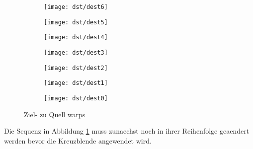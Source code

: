 \begin{figure}[htbp]
	\centering
	    \begin{adjustbox}{margin=-20mm 0mm 0mm 0.2mm}
	    	
	\begin{subfigure}[b]{0.19\textwidth}
		\centering
		\texttt{[image: dst/dest6]} %
		\caption{}
	\end{subfigure}
		\begin{subfigure}[b]{0.19\textwidth}
		\centering
		\texttt{[image: dst/dest5]} %
		\caption{}
	\end{subfigure}
		\begin{subfigure}[b]{0.19\textwidth}
		\centering
		\texttt{[image: dst/dest4]} %
		\caption{}
	\end{subfigure}
		\begin{subfigure}[b]{0.19\textwidth}
		\centering
		\texttt{[image: dst/dest3]} %
		\caption{}
	\end{subfigure}
		\begin{subfigure}[b]{0.19\textwidth}
		\centering
		\texttt{[image: dst/dest2]} %
		\caption{}
	\end{subfigure}
		\begin{subfigure}[b]{0.19\textwidth}
		\centering
		\texttt{[image: dst/dest1]} %
		\caption{}
	\end{subfigure}
		\begin{subfigure}[b]{0.19\textwidth}
		\centering
		\texttt{[image: dst/dest0]} %
		\caption{}
	\end{subfigure}
	
		    \end{adjustbox}
		    
	\caption{Ziel- zu Quell warps}
	\label{fig:destinations}
\end{figure}

Die Sequenz in Abbildung \ref{fig:destinations} muss zunaechst noch
in ihrer Reihenfolge geaendert werden bevor
die Kreuzblende angewendet wird.

